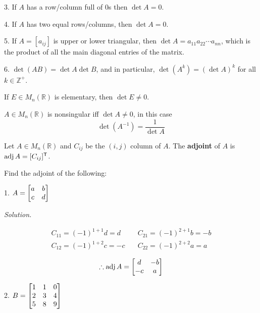 3. If $A$ has a row/column full of 0s then $\det A = 0$.

4. If $A$ has two equal rows/columns, then $\det A = 0$.

5. If $A = [a_{ij}]$ is upper or lower triangular, then $\det A = a_{11}a_{22}\cdots a_{nn}$, which is the product of all the main diagonal entries of the matrix.

6. $\det(AB) = \det A \det B$, and in particular, $\det(A^k) = (\det A)^k$ for all $k \in \mathbb{Z}^+$.

\lline

\begin{theorem}
If $E \in M_n(\mathbb{R})$ is elementary, then $\det E \neq 0$.
\end{theorem}

\begin{theorem}
$A \in M_n(\mathbb{R})$ is nonsingular iff $\det A \neq 0$, in this case
$$\det(A^{-1}) = \frac{1}{\det A}$$
\end{theorem}

\begin{definition}
Let $A \in M_n(\mathbb{R})$ and $C_{ij}$ be the $(i, j)$ column of $A$. The \textbf{adjoint} of $A$ is $\operatorname{adj} A = [C_{ij}]^{\mathsf{T}}$.
\end{definition}

\begin{example}
Find the adjoint of the following:

1. $\displaystyle A = \begin{bmatrix} a & b \\ c & d \end{bmatrix}$

\textit{Solution.}

\begin{align*}
C_{11} = (-1)^{1 + 1}d = d \quad & C_{21} = (-1)^{2 + 1} b = -b \\
C_{12} = (-1)^{1 + 2}c = -c \quad & C_{22} = (-1)^{2 + 2}a = a
\end{align*}

$$\therefore \operatorname{adj} A = \begin{bmatrix}  d & -b \\ -c & a \end{bmatrix}$$

2. $\displaystyle B = \begin{bmatrix} 1 & 1 & 0 \\ 2 & 3 & 4 \\ 5 & 8 & 9 \end{bmatrix}$
\end{example}

